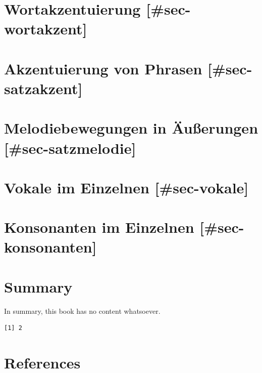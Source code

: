 \documentclass[
  letterpaper,
]{scrbook}
\begin{document}
\hypertarget{wortakzentuierung-sec-wortakzent}{%
\chapter{Wortakzentuierung
{[}\#sec-wortakzent{]}}\label{wortakzentuierung-sec-wortakzent}}

\hypertarget{akzentuierung-von-phrasen-sec-satzakzent}{%
\chapter{Akzentuierung von Phrasen
{[}\#sec-satzakzent{]}}\label{akzentuierung-von-phrasen-sec-satzakzent}}

\hypertarget{melodiebewegungen-in-uxe4uuxdferungen-sec-satzmelodie}{%
\chapter{Melodiebewegungen in Äußerungen
{[}\#sec-satzmelodie{]}}\label{melodiebewegungen-in-uxe4uuxdferungen-sec-satzmelodie}}

\hypertarget{vokale-im-einzelnen-sec-vokale}{%
\chapter{Vokale im Einzelnen
{[}\#sec-vokale{]}}\label{vokale-im-einzelnen-sec-vokale}}

\hypertarget{konsonanten-im-einzelnen-sec-konsonanten}{%
\chapter{Konsonanten im Einzelnen
{[}\#sec-konsonanten{]}}\label{konsonanten-im-einzelnen-sec-konsonanten}}


\hypertarget{summary}{%
\chapter{Summary}\label{summary}}

In summary, this book has no content whatsoever.

\begin{verbatim}
[1] 2
\end{verbatim}


\hypertarget{references}{%
\chapter*{References}\label{references}}
\end{document}
